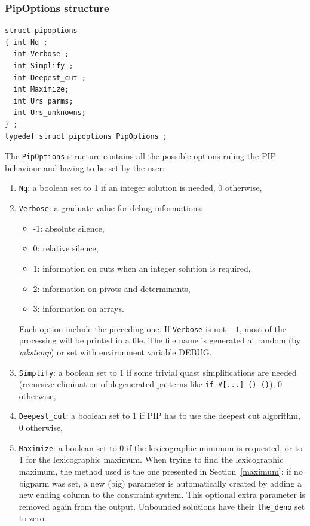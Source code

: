 \documentclass[12pt,a4paper]{article}
\begin{document}
\subsubsection{PipOptions structure}
\begin{verbatim}
struct pipoptions
{ int Nq ;
  int Verbose ;
  int Simplify ;
  int Deepest_cut ;
  int Maximize;
  int Urs_parms;
  int Urs_unknowns;
} ;      
typedef struct pipoptions PipOptions ;
\end{verbatim}
The {\tt PipOptions} structure contains all the possible options ruling
the PIP behaviour and having to be set by the user: 
\begin{enumerate}
\item {\tt Nq}: a boolean set to 1 if an integer solution is needed, 0
      otherwise,
\item {\tt Verbose}: a graduate value for debug informations:
      \begin{itemize}
      \item -1: absolute silence,
      \item 0: relative silence,
      \item 1: information on cuts when an integer solution is required,
      \item 2: information on pivots and determinants,
      \item 3: information on arrays.
      \end{itemize}
      Each option include the preceding one.
      If {\tt Verbose} is not $-1$, most of the processing will be printed in
      a file. The file name is generated at random (by \textit{mkstemp}) or
      set with environment variable DEBUG.
\item {\tt Simplify}: a boolean set to 1 if some trivial quast simplifications
      are needed (recursive elimination of degenerated patterns like
      {\tt if \#[...] () ()}), 0 otherwise,
\item {\tt Deepest\_cut}: a boolean set to 1 if PIP has to use the deepest cut
      algorithm, 0 otherwise,
\item {\tt Maximize}: a boolean set to 0 if the lexicographic
      minimum is requested, or to 1 for the lexicographic maximum. When trying to
      find the lexicographic maximum, the method used is the one
      presented in Section~\ref{maximum}: if no bigparm was set, a new (big)
      parameter is automatically created by adding a new ending column to the
      constraint system.  This optional extra parameter is removed again from the
      output.  Unbounded solutions have their \verb+the_deno+ set to zero.

\end{enumerate}
\end{document}
